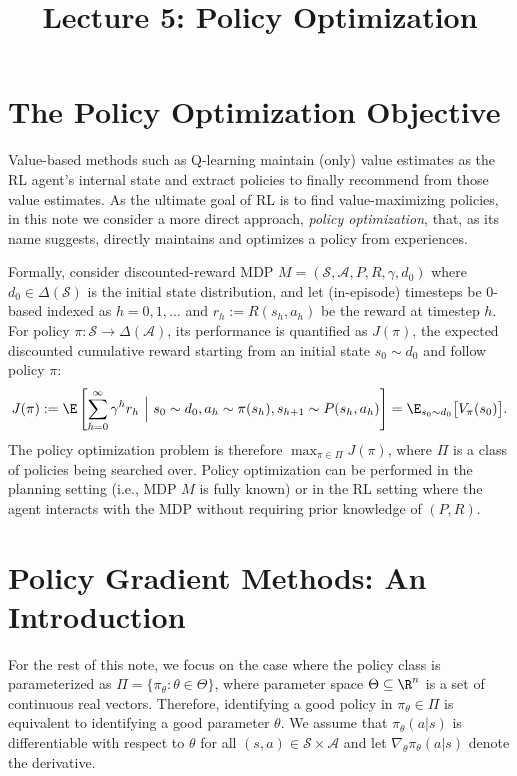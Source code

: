 \title{Lecture 5: Policy Optimization}


\section{The Policy Optimization Objective}
Value-based methods such as Q-learning maintain (only) value estimates as the RL agent's internal state and extract policies to finally recommend from those value estimates.
As the ultimate goal of RL is to find value-maximizing policies, in this note we consider a more direct approach, {\em policy optimization}, that, as its name suggests, directly maintains and optimizes a policy from experiences.

Formally, consider discounted-reward MDP $M=(\mathcal{S},\mathcal{A}, P, R, \gamma, d_0)$ where $d_0\in\Delta(\mathcal{S})$ is the initial state distribution, and let (in-episode) timesteps be 0-based indexed as $h=0,1,\ldots$ and $r_h:=R(s_h,a_h)$ be the reward at timestep $h$.
For policy $\pi:\mathcal{S}\to\Delta(\mathcal{A})$, its performance is quantified as $J(\pi)$, the expected discounted cumulative reward starting from an initial state $s_0 \sim d_0$ and follow policy $\pi$:
\begin{align*}
    J(\pi):= \E\left[\sum_{h=0}^{\infty} \gamma^h r_h ~\Big|~ s_0\sim d_0, a_h \sim \pi(s_h), s_{h+1}\sim P(s_h, a_h) \right]
    = \E_{s_0\sim d_0} \big[ V_\pi(s_0) \big]
    .
\end{align*}
The policy optimization problem is therefore
$
    \max_{\pi \in \Pi} J(\pi)
$, where $\Pi$ is a class of policies being searched over.
Policy optimization can be performed in the planning setting (i.e., MDP $M$ is fully known) or in the RL setting where the agent interacts with the MDP without requiring prior knowledge of $(P, R)$.

\section{Policy Gradient Methods: An Introduction}
\label{sec:Policy Gradient Methods: An Introduction}
For the rest of this note, we focus on the case where the policy class is parameterized as $\Pi=\{\pi_\theta: \theta\in\Theta\}$, where parameter space $\Theta\subseteq\R^n$ is a set of continuous real vectors.
Therefore, identifying a good policy in $\pi_\theta \in \Pi$ is equivalent to identifying a good parameter $\theta$.
We assume that $\pi_\theta(a|s)$ is differentiable with respect to $\theta$ for all $(s,a)\in\mathcal{S}\times\mathcal{A}$ and let $\nabla_\theta\pi_\theta(a|s)$ denote the derivative.

